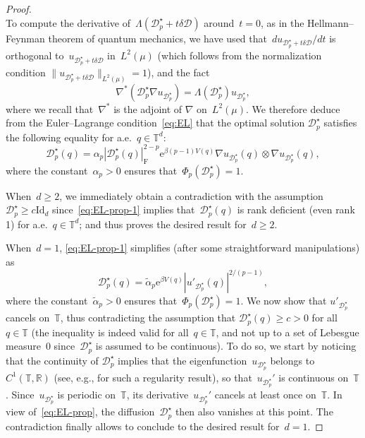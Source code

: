\documentclass{article}
\newcommand{\rme}{\mathrm{e}}
\newcommand{\R}{\mathbb{R}}
\newcommand{\Id}{\mathrm{Id}}
\renewcommand{\geq}{\geqslant}
\def\R{\mathbb{R}}
\def\T{\mathbb{T}}
\newcommand{\Diff}{\mathcal{D}}
\newcommand{\F}{\mathrm{F}}
\newcommand{\normF}[1]{\left| #1 \right|_{\F}}
\renewcommand{\dim}{d}
\begin{document}
\begin{proof}
\[\]
To compute the derivative of~${\Lambda}(\Diff_p^\star + t\delta\Diff)$ around~$t=0$, as in the Hellmann--Feynman theorem of quantum mechanics, we have used that~$d u_{\Diff_p^{\star} + t\delta\Diff}/dt$ is orthogonal to~$u_{\Diff_p^{\star} + t\delta\Diff}$ in~$L^2(\mu)$ (which follows from the normalization condition $\|u_{\Diff_p^{\star} + t\delta\Diff}\|_{L^2(\mu)} = 1$), and the fact
\begin{equation}
  \label{eq:eig_value_pbm_optimal_lemEL}
  \nabla^*(\Diff_p^{\star}\nabla u_{\Diff_p^{\star}}) = \Lambda(\Diff_p^{\star}) u_{\Diff_p^{\star}},
\end{equation}
where we recall that~$\nabla^*$ is the adjoint of $\nabla$ on~$L^2(\mu)$. We therefore deduce from the Euler--Lagrange condition~\eqref{eq:EL} that the optimal solution $\Diff^{\star}_p$ satisfies the following equality for a.e.~$q\in\T^\dim$:
\begin{equation}
  \label{eq:EL-prop-1}
  \Diff^{\star}_p(q) = \alpha_p \normF{\Diff^{\star}_p(q)}^{2-p} \rme^{\beta(p-1)V(q)} \nabla u_{\Diff^{\star}_p}(q)\otimes \nabla u_{\Diff^{\star}_p}(q),
\end{equation}
where the constant~$\alpha_p > 0$ ensures that~$\Phi_p(\Diff^{\star}_p) = 1$. 

When~$\dim \geq 2$, we immediately obtain a contradiction with the assumption~$\Diff_p^{\star}\geq c \Id_\dim$ since~\eqref{eq:EL-prop-1} implies that~$\Diff^{\star}_p(q)$ is rank deficient (even rank 1) for a.e.~$q\in\T^\dim$; and thus proves the desired result for~$\dim \geq 2$.

When~$\dim=1$, \eqref{eq:EL-prop-1} simplifies (after some straightforward manipulations) as 
\begin{equation}
  \label{eq:EL-prop}
  \Diff^{\star}_p(q) = \widetilde{\alpha}_p \rme^{\beta V(q)} \left| u'_{\Diff^{\star}_p}(q) \right|^{2/(p-1)}, 
\end{equation}
where the constant~$\widetilde{\alpha}_p > 0$ ensures that~$\Phi_p(\Diff^{\star}_p) = 1$. We now show that $u'_{\Diff^{\star}_p}$ cancels on~$\T$, thus contradicting the assumption that $\Diff_p^{\star}(q)\geq c > 0$ for all~$q\in\T$ (the inequality is indeed valid for all~$q \in \T$, and not up to a set of Lebesgue measure~0 since~$\Diff^\star_p$ is assumed to be continuous). To do so, we start by noticing that the continuity of $\Diff_p^\star$ implies that the eigenfunction~$u_{\Diff_p^{\star}}$ belongs to~$C^1(\T,\R)$ (see, e.g., \cite[Theorem~2.27]{fernandezregularity} for such a regularity result), so that~$u_{\Diff^{\star}_p}'$ is continuous on~$\T$. Since~$u_{\Diff^{\star}_p}$ is periodic on~$\T$, its derivative~$u_{\Diff^{\star}_p}'$ cancels at least once on~$\T$. In view of~\eqref{eq:EL-prop}, the diffusion~$\Diff^\star_p$ then also vanishes at this point. The contradiction finally allows to conclude to the desired result for~$\dim=1$.
\end{proof}
\end{document}
